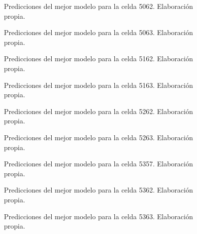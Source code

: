\begin{figure}[h!]
	\centering
	
	\caption{Predicciones del mejor modelo para la celda 5062. Elaboración propia.}
	\label{5062_hat}
\end{figure}
\FloatBarrier

\begin{figure}[h!]
	\centering
	
	\caption{Predicciones del mejor modelo para la celda 5063. Elaboración propia.}
	\label{5063_hat}
\end{figure}
\FloatBarrier

\begin{figure}[h!]
	\centering
	
	\caption{Predicciones del mejor modelo para la celda 5162. Elaboración propia.}
	\label{5162_hat}
\end{figure}
\FloatBarrier

\begin{figure}[h!]
	\centering
	
	\caption{Predicciones del mejor modelo para la celda 5163. Elaboración propia.}
	\label{5163_hat}
\end{figure}
\FloatBarrier

\begin{figure}[h!]
	\centering
	
	\caption{Predicciones del mejor modelo para la celda 5262. Elaboración propia.}
	\label{5262_hat}
\end{figure}
\FloatBarrier

\begin{figure}[h!]
	\centering
	
	\caption{Predicciones del mejor modelo para la celda 5263. Elaboración propia.}
	\label{5263_hat}
\end{figure}
\FloatBarrier

\begin{figure}[h!]
	\centering
	
	\caption{Predicciones del mejor modelo para la celda 5357. Elaboración propia.}
	\label{5357_hat}
\end{figure}
\FloatBarrier

\begin{figure}[h!]
	\centering
	
	\caption{Predicciones del mejor modelo para la celda 5362. Elaboración propia.}
	\label{5362_hat}
\end{figure}
\FloatBarrier

\begin{figure}[h!]
	\centering
	
	\caption{Predicciones del mejor modelo para la celda 5363. Elaboración propia.}
	\label{5363_hat}
\end{figure}
\FloatBarrier